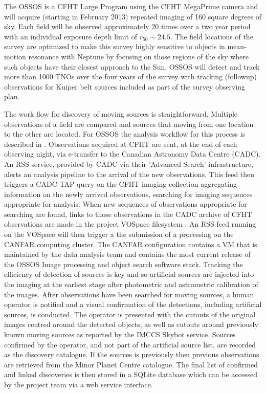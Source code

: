 \documentclass[11pt,twoside]{article}
\begin{document}
The OSSOS is a CFHT Large Program using the CFHT MegaPrime camera and will acquire (starting in February 2013) repeated imaging of 160 square degrees of sky.  
Each field will be observed approximately 20 times over a two year period with an individual exposure depth limit of $r_{50} \sim 24.5$.  
The field locations  of the survey are optimized to make this survey highly sensitive to objects in mean-motion resonance with Neptune by focusing on those regions of the sky where such objects have their closest approach to the Sun.   
OSSOS will detect and track more than 1000 TNOs over the four years of the survey with tracking (followup) observations for Kuiper belt sources included as part of the survey observing plan.

The work flow for discovery of moving sources is straightforward.  
Multiple observations of a field are compared and sources that moving from one location to the other are located. 
For OSSOS the analysis workflow for this process is described in \citep{2004MNRAS.347..471P}. 
Observations acquired at CFHT are sent, at the end of each observing night, via e-transfer to the Canadian Astronomy Data Centre (CADC).   
An RSS service, provided by CADC via their 'Advanced Search' infrastructure, alerts an analysis pipeline to the arrival of the new observations.  
This feed then triggers a CADC TAP query on the CFHT imaging collection aggregating information on the newly arrived observations, searching for imaging sequences appropriate for analysis.  
When new sequences of observations appropriate for searching are found, links to those observations in the CADC archive of CFHT observations are made in the project VOSpace filesystem \citep{2012ASPC..461..367K}.
An RSS feed running on the VOSpace will then trigger a the submission of a processing on the CANFAR \citep{2009ASPC..411..185G} computing cluster.   
The CANFAR configuration contains a VM that is maintained by the data analysis team and contains the most current release of the OSSOS Image processing and object search software stack.
Tracking the efficiency of detection of sources is key and so artificial sources are injected into the imaging at the earliest stage after photometric and astrometric calibration of the images. 
After observations have been searched for moving sources, a human operator  is notified and a visual confirmation of the detections, including artificial sources, is conducted.  
The operator is presented with the cutouts of the original images centred around the detected objects, as well as cutouts around previously known moving sources as reported by the IMCCS Skybot \citep{2006ASPC..351..367B} service.
Sources  confirmed by the operator, and not part of the artificial source list, are recorded as the discovery catalogue.  
If the sources is previously then previous observations are retrieved from the Minor Planet Centre catalogue.
The final list of confirmed and linked discoveries is then stored in a SQLite database which can be accessed by the project team via a web service interface. 
\end{document}
